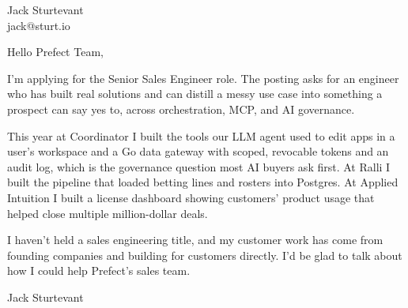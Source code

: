 \documentclass[11pt]{article}
\begin{document}
\raggedright

{\namefont\fontsize{20pt}{24pt}\selectfont Jack Sturtevant}\\[-0.3em]
jack@sturt.io

\vspace{1.2em}

Hello Prefect Team,

I'm applying for the Senior Sales Engineer role. The posting asks for an engineer who has built real solutions and can distill a messy use case into something a prospect can say yes to, across orchestration, MCP, and AI governance.

This year at Coordinator I built the tools our LLM agent used to edit apps in a user's workspace and a Go data gateway with scoped, revocable tokens and an audit log, which is the governance question most AI buyers ask first. At Ralli I built the pipeline that loaded betting lines and rosters into Postgres. At Applied Intuition I built a license dashboard showing customers' product usage that helped close multiple million-dollar deals.

I haven't held a sales engineering title, and my customer work has come from founding companies and building for customers directly. I'd be glad to talk about how I could help Prefect's sales team.

\vspace{0.6em}
Jack Sturtevant
\end{document}
